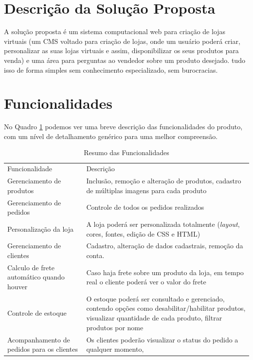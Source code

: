 \documentclass[a4paper,12pt]{monografia}
\begin{document}
\section{Descrição da Solução Proposta} %
\label{sec:descri_o_da_solu_o_proposta}

A solução proposta é um sistema computacional web para criação de lojas virtuais (um CMS voltado para criação de lojas, onde um usuário poderá criar, personalizar as suas lojas virtuais e assim, disponibilizar os seus produtos para venda) e uma área para perguntas ao vendedor sobre um produto desejado. tudo isso de forma simples sem conhecimento especializado, sem burocracias. 


\section{Funcionalidades} %
\label{sec:funcionalidades}

No Quadro \ref{quadro:funcionalidades} podemos ver uma breve descrição das funcionalidades do produto, com um nível de detalhamento genérico para uma melhor compreensão.


\begin{longtable}{|p{7cm}|p{7cm}|}
\caption{Resumo das Funcionalidades}
\label{quadro:funcionalidades}
\hline
\rowcolor{ballblue}
Funcionalidade & Descrição	\\	
Gerenciamento de produtos & Inclusão, remoção e alteração de produtos, cadastro de múltiplas imagens para cada produto
\\	
\hline
Gerenciamento de pedidos & Controle de todos os pedidos realizados
\\	
\hline
Personalização da loja & A loja poderá ser personalizada totalmente (\textit{layout}, cores, fontes, edição de CSS e HTML)
\\	
\hline
Gerenciamento de clientes & Cadastro, alteração de dados cadastrais, remoção da conta.
\\	
\hline
Calculo de frete automático quando houver & Caso haja frete sobre um produto da loja, em tempo real o cliente poderá ver o valor do frete
\\	
\hline
Controle de estoque & O estoque poderá ser consultado e gerenciado, contendo opções como desabilitar/habilitar produtos, visualizar quantidade de cada produto, filtrar produtos por nome
\\	
\hline
Acompanhamento de pedidos para os clientes & Os clientes poderão visualizar o status do pedido a qualquer momento,
\\	
\hline
\end{longtable}	
\end{document}
